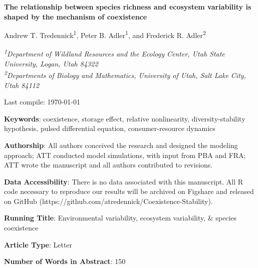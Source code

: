 \documentclass[12pt,]{article}
\title{}
\author{}
\date{}
\begin{document}
\renewcommand\linenumberfont{\normalfont\tiny\sffamily\color{gray}}

 \newcommand{\new}{\textcolor{blue}}

\begin{singlespace}

\begin{centering}

\Large{\textbf{The relationship between species richness and ecosystem variability is shaped by the mechanism of coexistence}}

\bigskip{} \bigskip{}

\renewcommand*{\thefootnote}{\fnsymbol{footnote}}

\normalsize{Andrew T. Tredennick\textsuperscript{1}, Peter B. Adler\textsuperscript{1}, and Frederick R. Adler\textsuperscript{2}}

\bigskip{}

\textit{\small{\textsuperscript{1}Department of Wildland Resources and the Ecology Center, Utah State University, Logan, Utah 84322}} \\
\textit{\small{\textsuperscript{2}Departments of Biology and Mathematics, University of Utah, Salt Lake City, Utah 84112}} 

\end{centering}

\vspace{3em}

Last compile: \today

\noindent \textbf{Keywords}: coexistence, storage effect, relative nonlinearity, diversity-stability hypothesis, pulsed differential equation, consumer-resource dynamics

\noindent \textbf{Authorship}: All authors conceived the research and designed the modeling approach; ATT conducted model simulations, with input from PBA and FRA; ATT wrote the manuscript and all authors contributed to revisions.

\noindent \textbf{Data Accessibility}: There is no data associated with this manuscript. All R code necessary to reproduce our results will be archived on Figshare and released on GitHub (https://github.com/atredennick/Coexistence-Stability).

\noindent \textbf{Running Title}: Environmental variability, ecosystem variability, \& species coexistence

\noindent \textbf{Article Type}: Letter

\noindent \textbf{Number of Words in Abstract}: 150


\end{singlespace}
\end{document}
